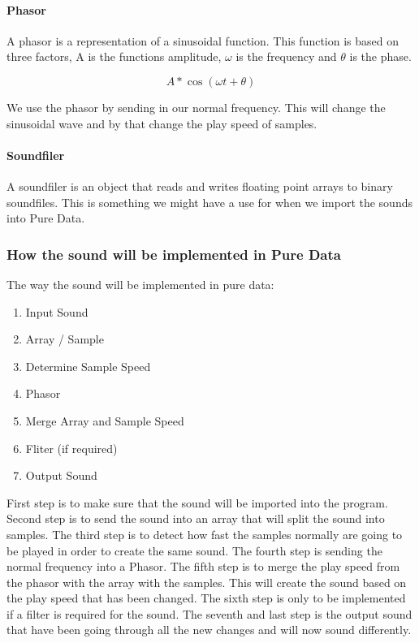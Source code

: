     

\paragraph{Phasor} %
\label{par:phasor}

A phasor is a representation of a sinusoidal function. 
This function is based on three factors, A is the functions amplitude, $\omega$ is the frequency and $\theta$ is the phase.  

\begin{equation}
    A * \cos(\omega t + \theta)
\end{equation}

We use the phasor by sending in our normal frequency. This will change the sinusoidal wave and by that change the play speed of samples.


\paragraph{Soundfiler} %
\label{par:Soundfiler}

A soundfiler is an object that reads and writes floating point arrays to binary soundfiles. This is something we might have a use for when we import the sounds into Pure Data.


\subsubsection{How the sound will be implemented in Pure Data} %
\label{ssub:how_the_sound_will_be_implemented_in_pure_data}

The way the sound will be implemented in pure data:

\begin{enumerate}
    \item Input Sound
    \item Array / Sample
    \item Determine Sample Speed
    \item Phasor
    \item Merge Array and Sample Speed
    \item Fliter (if required)
    \item Output Sound
\end{enumerate}

First step is to make sure that the sound will be imported into the program. 
Second step is to send the sound into an array that will split the sound into samples. 
The third step is to detect how fast the samples normally are going to be played in order to create the same sound. 
The fourth step is sending the normal frequency into a Phasor. 
The fifth step is to merge the play speed from the phasor with the array with the samples. 
This will create the sound based on the play speed that has been changed. 
The sixth step is only to be implemented if a filter is required for the sound. 
The seventh and last step is the output sound that have been going through all the new changes and will now sound differently.

